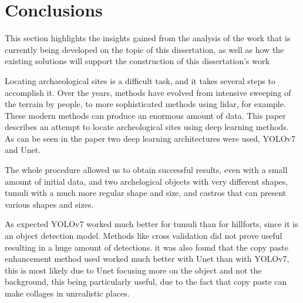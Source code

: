 \chapter{Conclusions}
\label{chapter:conclusion}

\begin{introduction}
This section highlights the insights gained from the analysis of the work that is currently being developed on the topic of this dissertation, as well as how the existing solutions will support the construction of this dissertation's work
\end{introduction}


Locating archaeological sites is a difficult task, and it takes several steps to accomplish it. Over the years, methods have evolved from intensive sweeping of the terrain by people, to more sophisticated methods using lidar, for example. These modern methods can produce an enormous amount of data. This paper describes an attempt to locate archeological sites using deep learning methods. As can be seen in the paper two deep learning architectures were used, YOLOv7 and Unet. 

The whole procedure allowed us to obtain successful results, even with a small amount of initial data, and two archelogical objects with very different shapes, tumuli with a much more regular shape and size, and castros that can present various shapes and sizes.

As expected YOLOv7 worked much better for tumuli than for hillforts, since it is an object detection model. Methods like cross validation did not prove useful resulting in a huge amount of detections. it was also found that the copy paste enhancement method used worked much better with Unet than with YOLOv7, this is most likely due to Unet focusing more on the object and not the background, this being particularly useful, due to the fact that copy paste can make collages in unrealistic places.



